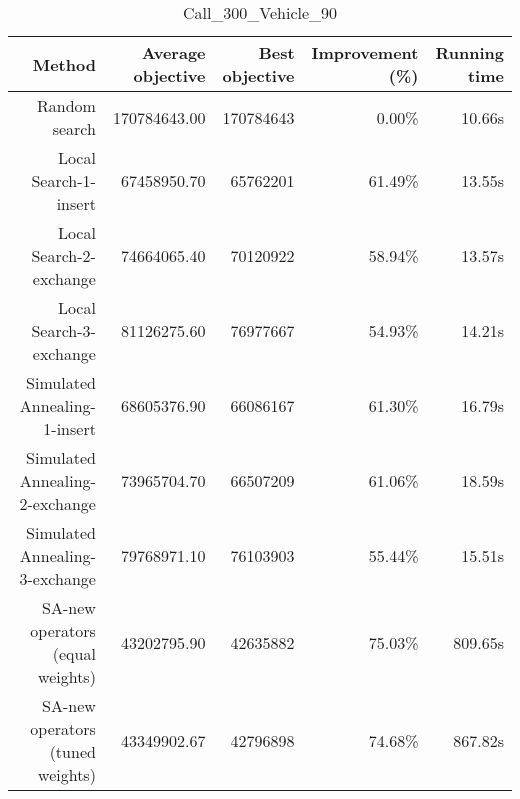 \begin{table}[ht]
\centering
\caption{Call\_300\_Vehicle\_90}
\label{tab:call300vehicle90}
\begin{tabular}{|r|r|r|r|r|}
Method & Average objective & Best objective & Improvement (\%) & Running time \\
\hline
Random search & 170784643.00 & 170784643 & 0.00\% & 10.66s\\
Local Search-1-insert & 67458950.70 & 65762201 & 61.49\% & 13.55s\\
Local Search-2-exchange & 74664065.40 & 70120922 & 58.94\% & 13.57s\\
Local Search-3-exchange & 81126275.60 & 76977667 & 54.93\% & 14.21s\\
Simulated Annealing-1-insert & 68605376.90 & 66086167 & 61.30\% & 16.79s\\
Simulated Annealing-2-exchange & 73965704.70 & 66507209 & 61.06\% & 18.59s\\
Simulated Annealing-3-exchange & 79768971.10 & 76103903 & 55.44\% & 15.51s\\
SA-new operators (equal weights) & 43202795.90 & 42635882 & 75.03\% & 809.65s\\
SA-new operators (tuned weights) & 43349902.67 & 42796898 & 74.68\% & 867.82s\\
\end{tabular}%
\end{table}
